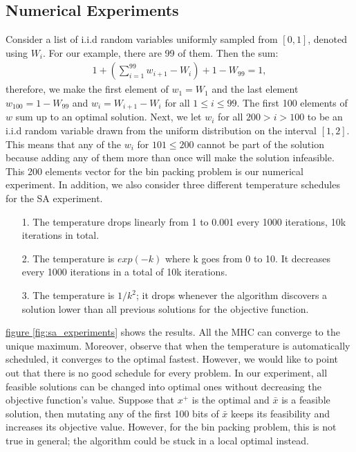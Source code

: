 \documentclass[]{article}
\theoremstyle{definition}
\begin{document}
    \subsection{Numerical Experiments}
        Consider a list of i.i.d random variables uniformly sampled from $[0, 1]$, denoted using $W_i$. For our example, there are 99 of them. Then the sum: 
        \begin{align*}
           1 + \left(
            \sum_{i = 1}^{99} w_{i + 1} - W_i
           \right) + 1 - W_{99} = 1, 
        \end{align*}
        therefore, we make the first element of $w_1 = W_1$ and the last element $w_{100} = 1 - W_{99}$ and $w_i = W_{i + 1} - W_{i}$ for all $1 \le i \le 99$. The first 100 elements of $w$ sum up to an optimal solution. Next, we let $w_i$ for all $200 > i > 100$ to be an i.i.d random variable drawn from the uniform distribution on the interval $[1, 2]$. This means that any of the $w_i$ for $101 \le 200$ cannot be part of the solution because adding any of them more than once will make the solution infeasible. This 200 elements vector for the bin packing problem is our numerical experiment. In addition, we also consider three different temperature schedules for the SA experiment. 
        \begin{itemize}
            \item [1.] The temperature drops linearly from 1 to 0.001 every 1000 iterations, 10k iterations in total. 
            \item [2.] The temperature is $exp(-k)$ where k goes from 0 to 10. It decreases every 1000 iterations in a total of 10k iterations. 
            \item [3.] The temperature is $1/k^2$; it drops whenever the algorithm discovers a solution lower than all previous solutions for the objective function.
        \end{itemize}
        \hyperref[fig:sa_experiments]{figure \ref*{fig:sa_experiments}} shows the results. All the MHC can converge to the unique maximum. Moreover, observe that when the temperature is automatically scheduled, it converges to the optimal fastest. However, we would like to point out that there is no good schedule for every problem. In our experiment, all feasible solutions can be changed into optimal ones without decreasing the objective function's value. Suppose that $x^+$  is the optimal and $\bar x$ is a feasible solution, then mutating any of the first 100 bits of $\bar x$ keeps its feasibility and increases its objective value. However, for the bin packing problem, this is not true in general; the algorithm could be stuck in a local optimal instead. 
\end{document}
